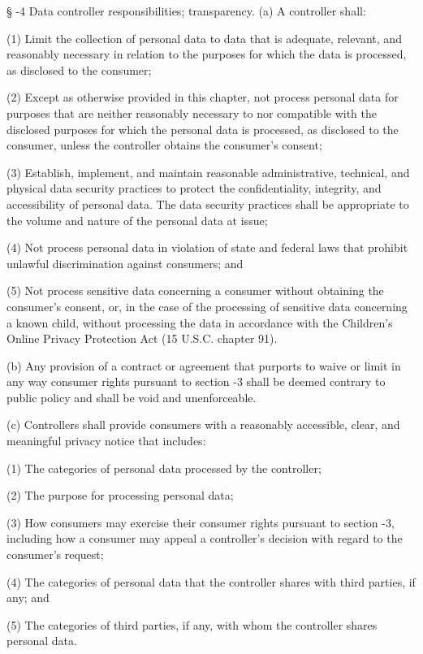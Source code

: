      §   -4  Data controller responsibilities; transparency.  (a)  A controller shall:

     (1)  Limit the collection of personal data to data that is adequate, relevant, and reasonably necessary in relation to the purposes for which the data is processed, as disclosed to the consumer;

     (2)  Except as otherwise provided in this chapter, not process personal data for purposes that are neither reasonably necessary to nor compatible with the disclosed purposes for which the personal data is processed, as disclosed to the consumer, unless the controller obtains the consumer's consent;

     (3)  Establish, implement, and maintain reasonable administrative, technical, and physical data security practices to protect the confidentiality, integrity, and accessibility of personal data.  The data security practices shall be appropriate to the volume and nature of the personal data at issue;

     (4)  Not process personal data in violation of state and federal laws that prohibit unlawful discrimination against consumers; and

     (5)  Not process sensitive data concerning a consumer without obtaining the consumer's consent, or, in the case of the processing of sensitive data concerning a known child, without processing the data in accordance with the Children's Online Privacy Protection Act (15 U.S.C. chapter 91).

     (b)  Any provision of a contract or agreement that purports to waive or limit in any way consumer rights pursuant to section    -3 shall be deemed contrary to public policy and shall be void and unenforceable.

     (c)  Controllers shall provide consumers with a reasonably accessible, clear, and meaningful privacy notice that includes:

     (1)  The categories of personal data processed by the controller;

     (2)  The purpose for processing personal data;

     (3)  How consumers may exercise their consumer rights pursuant to section    -3, including how a consumer may appeal a controller's decision with regard to the consumer's request;

     (4)  The categories of personal data that the controller shares with third parties, if any; and

     (5)  The categories of third parties, if any, with whom the controller shares personal data.

